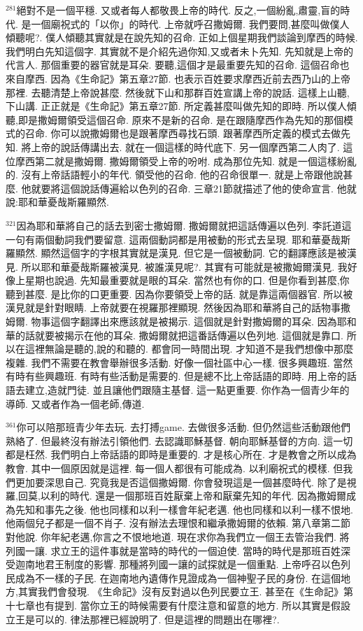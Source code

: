 \documentclass{book}
\begin{document}
$^{281}$絕對不是一個平穩.
又或者每人都敬畏上帝的時代.
反之,一個紛亂,肅靈,盲的時代.
是一個廟祝式的「以你」的時代.
上帝就呼召撒姆爾.
我們要問,甚麼叫做僕人傾聽呢?.
僕人傾聽其實就是在說先知的召命.
正如上個星期我們談論到摩西的時候.
我們明白先知這個字.
其實就不是介紹先過你知,又或者未卜先知.
先知就是上帝的代言人.
那個重要的器官就是耳朵.
要聽,這個才是最重要先知的召命.
這個召命也來自摩西.
因為《生命記》第五章27節.
也表示百姓要求摩西近前去西乃山的上帝那裡.
去聽清楚上帝說甚麼.
然後就下山和那群百姓宣講上帝的說話.
這樣上山聽,下山講.
正正就是《生命記》第五章27節.
所定義甚麼叫做先知的即時.
所以僕人傾聽,即是撒姆爾領受這個召命.
原來不是新的召命.
是在跟隨摩西作為先知的那個模式的召命.
你可以說撒姆爾也是跟著摩西尋找石頭.
跟著摩西所定義的模式去做先知.
將上帝的說話傳講出去.
就在一個這樣的時代底下.
另一個摩西第二人肉了.
這位摩西第二就是撒姆爾.
撒姆爾領受上帝的吩咐.
成為那位先知.
就是一個這樣紛亂的.
沒有上帝話語輕小的年代.
領受他的召命.
他的召命很單一.
就是上帝跟他說甚麼.
他就要將這個說話傳遍給以色列的召命.
三章21節就描述了他的使命宣言.
他就說:耶和華憂哉斯羅顯然.

$^{321}$因為耶和華將自己的話去到密士撒姆爾.
撒姆爾就把這話傳遍以色列.
李託道這一句有兩個動詞我們要留意.
這兩個動詞都是用被動的形式去呈現.
耶和華憂哉斯羅顯然.
顯然這個字的字根其實就是漢見.
但它是一個被動詞.
它的翻譯應該是被漢見.
所以耶和華憂哉斯羅被漢見.
被誰漢見呢?.
其實有可能就是被撒姆爾漢見.
我好像上星期也說過.
先知最重要就是眼的耳朵.
當然也有你的口.
但是你看到甚麼,你聽到甚麼.
是比你的口更重要.
因為你要領受上帝的話.
就是靠這兩個器官.
所以被漢見就是針對眼睛.
上帝就要在視羅那裡顯現.
然後因為耶和華將自己的話物事撒姆爾.
物事這個字翻譯出來應該就是被揭示.
這個就是針對撒姆爾的耳朵.
因為耶和華的話就要被揭示在他的耳朵.
撒姆爾就把這番話傳遍以色列地.
這個就是靠口.
所以在這裡無論是聽的,說的和聽的.
都會同一時間出現.
才知道不是我們想像中那麼複雜.
我們不需要在教會舉辦很多活動.
好像一個社區中心一樣.
很多興趣班.
當然有時有些興趣班.
有時有些活動是需要的.
但是總不比上帝話語的即時.
用上帝的話語去建立,造就門徒.
並且讓他們跟隨主基督.
這一點更重要.
你作為一個青少年的導師.
又或者作為一個老師,傳道.

$^{361}$你可以陪那班青少年去玩.
去打搏game.
去做很多活動.
但仍然這些活動跟他們熟絡了.
但最終沒有辦法引領他們.
去認識耶穌基督.
朝向耶穌基督的方向.
這一切都是枉然.
我們明白上帝話語的即時是重要的.
才是核心所在.
才是教會之所以成為教會.
其中一個原因就是這裡.
每一個人都很有可能成為.
以利廟祝式的模樣.
但我們更加要深思自己.
究竟我是否這個撒姆爾.
你會發現這是一個甚麼時代.
除了是視羅,回莫,以利的時代.
還是一個那班百姓厭棄上帝和厭棄先知的年代.
因為撒姆爾成為先知和事先之後.
他也同樣和以利一樣會年紀老邁.
他也同樣和以利一樣不恨地.
他兩個兒子都是一個不肖子.
沒有辦法去理恨和繼承撒姆爾的依賴.
第八章第二節對他說.
你年紀老邁,你言之不恨地地道.
現在求你為我們立一個王去管治我們.
將列國一讓.
求立王的這件事就是當時的時代的一個迫使.
當時的時代是那班百姓深受迦南地君王制度的影響.
那種將列國一讓的試探就是一個重點.
上帝呼召以色列民成為不一樣的子民.
在迦南地內遺傳作見證成為一個神聖子民的身份.
在這個地方,其實我們會發現.
《生命記》沒有反對過以色列民要立王.
甚至在《生命記》第十七章也有提到.
當你立王的時候需要有什麼注意和留意的地方.
所以其實是假設立王是可以的.
律法那裡已經說明了.
但是這裡的問題出在哪裡?.
\end{document}
